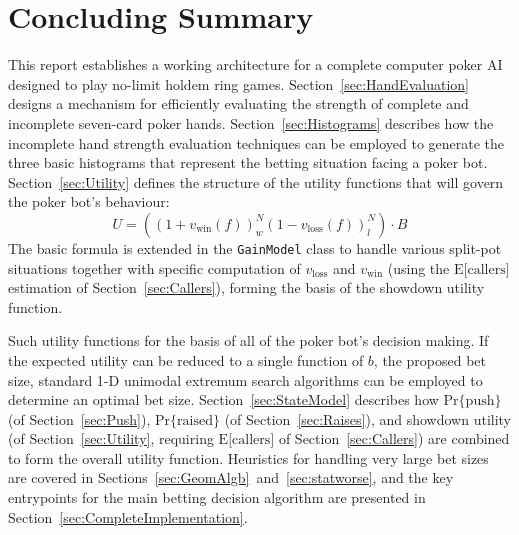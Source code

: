 


\chapter{Concluding Summary}
\label{sec:Summary}

This report establishes a working architecture for a complete computer poker AI designed to play no-limit holdem ring games.
Section~\ref{sec:HandEvaluation} designs a mechanism for efficiently evaluating the strength of complete and incomplete seven-card poker hands.
Section~\ref{sec:Histograms} describes how the incomplete hand strength evaluation techniques can be employed to generate the three basic histograms that represent the betting situation facing a poker bot.
Section~\ref{sec:Utility} defines the structure of the utility functions that will govern the poker bot's behaviour:
\[
U = \left( \left( 1 + v_{\mathrm{win}} \left( f \right) \right)^N_w \left( 1 - v_{\mathrm{loss}} \left( f \right) \right)^N_l \right) \cdot B
\]
The basic formula is extended in the \texttt{GainModel} class to handle various split-pot situations together with specific computation of $v_{\mathrm{loss}}$ and $v_{\mathrm{win}}$ (using the $\mathrm{E[callers}]$ estimation of Section~\ref{sec:Callers}), forming the basis of the showdown utility function.

Such utility functions for the basis of all of the poker bot's decision making.
If the expected utility can be reduced to a single function of $b$, the proposed bet size, standard 1-D unimodal extremum search algorithms can be employed to determine an optimal bet size.
Section~\ref{sec:StateModel} describes how $\mathrm{Pr\{push}\}$ (of Section~\ref{sec:Push}), $\mathrm{Pr\{raised}\}$ (of Section~\ref{sec:Raises}), and showdown utility (of Section~\ref{sec:Utility}, requiring $\mathrm{E[callers}]$ of Section~\ref{sec:Callers}) are combined to form the overall utility function.
Heuristics for handling very large bet sizes are covered in Sections~\ref{sec:GeomAlgb}~and~\ref{sec:statworse}, and the key entrypoints for the main betting decision algorithm are presented in Section~\ref{sec:CompleteImplementation}.


